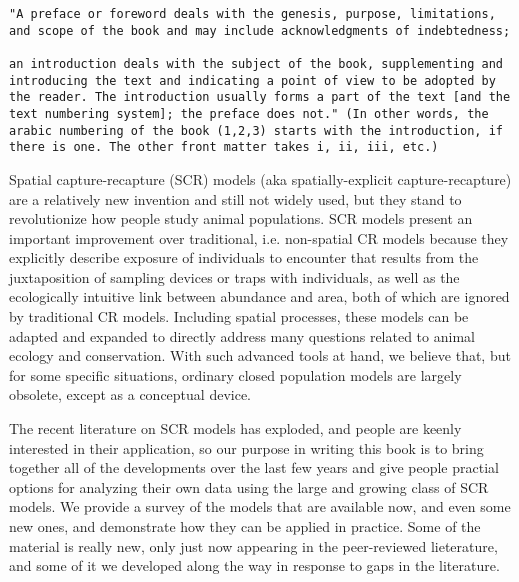 \begin{verbatim}
"A preface or foreword deals with the genesis, purpose, limitations,
and scope of the book and may include acknowledgments of indebtedness;

an introduction deals with the subject of the book, supplementing and
introducing the text and indicating a point of view to be adopted by
the reader. The introduction usually forms a part of the text [and the
text numbering system]; the preface does not." (In other words, the
arabic numbering of the book (1,2,3) starts with the introduction, if
there is one. The other front matter takes i, ii, iii, etc.)
\end{verbatim}


Spatial capture-recapture (SCR) models (aka spatially-explicit
capture-recapture) are a relatively new invention and still not widely
used, but they stand to revolutionize how people study animal
populations.
SCR models present an important improvement over traditional, 
i.e. non-spatial CR models because they explicitly describe
exposure of individuals to encounter that results from the 
juxtaposition of sampling devices or traps with 
individuals, as well as the ecologically intuitive
link between abundance and area, both of which are ignored by 
traditional CR models. Including spatial processes, these models can 
be adapted and expanded to directly address many questions related
to animal ecology and conservation. With such advanced tools at 
hand, we believe that, but for some specific situations, ordinary 
closed population models are largely obsolete, except as
a conceptual device.

The recent literature on SCR models has exploded, and people are
keenly interested in their application, so our purpose in writing this
book is to bring together 
all of the developments over the last few years and give people
practial options for analyzing their own data using the large and
growing class of SCR models.
We provide a survey of the models that are available now, 
and even some new ones, and demonstrate how they can be applied in
practice. Some of the material
is really new, only just now appearing in the peer-reviewed
lieterature, and some of it we developed along the way 
 in response to gaps in the
literature. 

